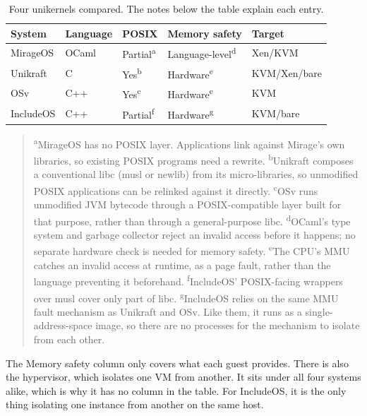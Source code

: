 \documentclass[12pt]{report}
\renewcommand{\_}{\origunderscore\allowbreak}
\begin{document}
\begin{table}[h]
\centering
\begin{tabular}{lllll}
\hline
\textbf{System} & \textbf{Language} & \textbf{POSIX} & \textbf{Memory safety} & \textbf{Target} \\
\hline
MirageOS   & OCaml  & Partial\textsuperscript{a} & Language-level\textsuperscript{d} & Xen/KVM \\
Unikraft   & C      & Yes\textsuperscript{b}     & Hardware\textsuperscript{e}       & KVM/Xen/bare \\
OSv        & C++    & Yes\textsuperscript{c}     & Hardware\textsuperscript{e}       & KVM \\
IncludeOS  & C++    & Partial\textsuperscript{f} & Hardware\textsuperscript{g}       & KVM/bare \\
\hline
\end{tabular}
\caption{Four unikernels compared. The notes below the table explain each entry.}
\label{tab:unikernel-comparison}
\begin{quote}
\footnotesize
\textsuperscript{a}MirageOS has no POSIX layer. Applications link against Mirage's own libraries, so existing POSIX programs need a rewrite. \textsuperscript{b}Unikraft composes a conventional libc (musl or newlib) from its micro-libraries, so unmodified POSIX applications can be relinked against it directly. \textsuperscript{c}OSv runs unmodified JVM bytecode through a POSIX-compatible layer built for that purpose, rather than through a general-purpose libc. \textsuperscript{d}OCaml's type system and garbage collector reject an invalid access before it happens; no separate hardware check is needed for memory safety. \textsuperscript{e}The CPU's MMU catches an invalid access at runtime, as a page fault, rather than the language preventing it beforehand. \textsuperscript{f}IncludeOS' POSIX-facing wrappers over musl cover only part of libc. \textsuperscript{g}IncludeOS relies on the same MMU fault mechanism as Unikraft and OSv. Like them, it runs as a single-address-space image, so there are no processes for the mechanism to isolate from each other.
\end{quote}
\end{table}

The Memory safety column only covers what each guest provides. There is also the hypervisor, which isolates one VM from another. It sits under all four systems alike, which is why it has no column in the table. For IncludeOS, it is the only thing isolating one instance from another on the same host.
\end{document}
